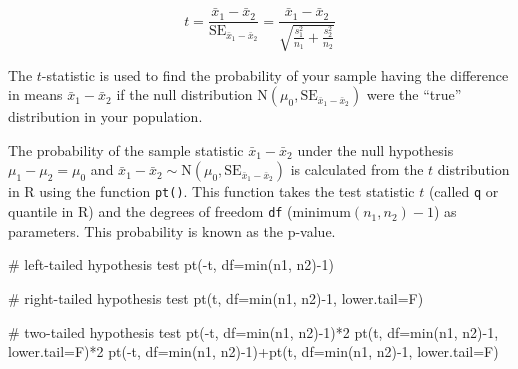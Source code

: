 \documentclass[
  letterpaper,
  DIV=11,
  numbers=noendperiod]{scrartcl}
\newenvironment{Shaded}{\begin{snugshade}}{\end{snugshade}}
\newcommand{\AttributeTok}[1]{\textcolor[rgb]{0.40,0.45,0.13}{#1}}
\newcommand{\CommentTok}[1]{\textcolor[rgb]{0.37,0.37,0.37}{#1}}
\newcommand{\DecValTok}[1]{\textcolor[rgb]{0.68,0.00,0.00}{#1}}
\newcommand{\FunctionTok}[1]{\textcolor[rgb]{0.28,0.35,0.67}{#1}}
\newcommand{\NormalTok}[1]{\textcolor[rgb]{0.00,0.23,0.31}{#1}}
\newcommand{\SpecialCharTok}[1]{\textcolor[rgb]{0.37,0.37,0.37}{#1}}
\begin{document}
\[
t=\frac{\bar{x}_1-\bar{x}_2}{\text{SE}_{\bar{x}_1-\bar{x}_2}}=\frac{\bar{x}_1-\bar{x}_2}{\sqrt{\frac{s_1^2}{n_1}+\frac{s_2^2}{n_2}}}
\]

The \(t\)-statistic is used to find the probability of your sample
having the difference in means \(\bar{x}_1-\bar{x}_2\) if the null
distribution
\(\text{N}\left(\mu_0, \text{SE}_{\bar{x}_1-\bar{x}_2}\right)\) were the
``true'' distribution in your population.

The probability of the sample statistic \(\bar{x}_1-\bar{x}_2\) under
the null hypothesis \(\mu_1-\mu_2=\mu_0\) and
\(\bar{x}_1-\bar{x}_2 \sim \text{N}\left(\mu_0, \text{SE}_{\bar{x}_1-\bar{x}_2}\right)\)
is calculated from the \(t\) distribution in R using the function
\texttt{pt()}. This function takes the test statistic \(t\) (called
\texttt{q} or quantile in R) and the degrees of freedom \texttt{df}
(\(\text{minimum}(n_1, n_2)-1\)) as parameters. This probability is
known as the p-value.

\begin{Shaded}
\begin{Highlighting}[]
\CommentTok{\# left{-}tailed hypothesis test}
\FunctionTok{pt}\NormalTok{(}\SpecialCharTok{{-}}\NormalTok{t, }\AttributeTok{df=}\FunctionTok{min}\NormalTok{(n1, n2)}\SpecialCharTok{{-}}\DecValTok{1}\NormalTok{)}

\CommentTok{\# right{-}tailed hypothesis test}
\FunctionTok{pt}\NormalTok{(t, }\AttributeTok{df=}\FunctionTok{min}\NormalTok{(n1, n2)}\SpecialCharTok{{-}}\DecValTok{1}\NormalTok{, }\AttributeTok{lower.tail=}\NormalTok{F)}

\CommentTok{\# two{-}tailed hypothesis test}
\FunctionTok{pt}\NormalTok{(}\SpecialCharTok{{-}}\NormalTok{t, }\AttributeTok{df=}\FunctionTok{min}\NormalTok{(n1, n2)}\SpecialCharTok{{-}}\DecValTok{1}\NormalTok{)}\SpecialCharTok{*}\DecValTok{2}
\FunctionTok{pt}\NormalTok{(t, }\AttributeTok{df=}\FunctionTok{min}\NormalTok{(n1, n2)}\SpecialCharTok{{-}}\DecValTok{1}\NormalTok{, }\AttributeTok{lower.tail=}\NormalTok{F)}\SpecialCharTok{*}\DecValTok{2}
\FunctionTok{pt}\NormalTok{(}\SpecialCharTok{{-}}\NormalTok{t, }\AttributeTok{df=}\FunctionTok{min}\NormalTok{(n1, n2)}\SpecialCharTok{{-}}\DecValTok{1}\NormalTok{)}\SpecialCharTok{+}\FunctionTok{pt}\NormalTok{(t, }\AttributeTok{df=}\FunctionTok{min}\NormalTok{(n1, n2)}\SpecialCharTok{{-}}\DecValTok{1}\NormalTok{, }\AttributeTok{lower.tail=}\NormalTok{F)}
\end{Highlighting}
\end{Shaded}
\end{document}
